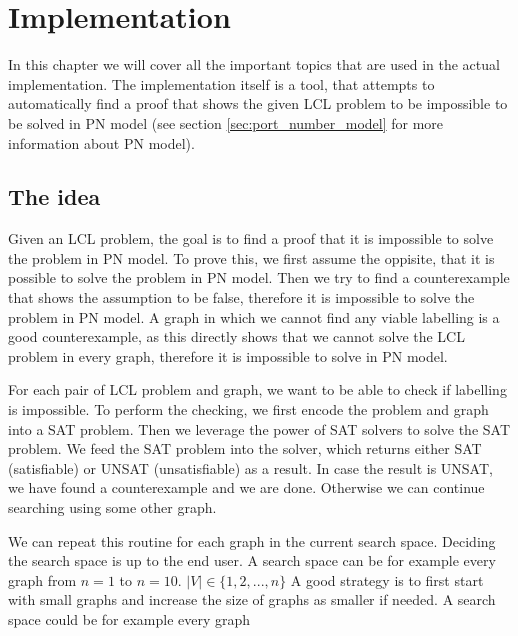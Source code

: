 

\section{Implementation} \label{sec:implementation}
In this chapter we will cover all the important topics that are used in the actual implementation.
The implementation itself is a tool, that attempts to automatically find a proof that shows the given LCL problem to be impossible to be solved in PN model (see section \ref{sec:port_number_model} for more information about PN model).

\subsection{The idea}
Given an LCL problem, the goal is to find a proof that it is impossible to solve the problem in PN model.
To prove this, we first assume the oppisite, that it is possible to solve the problem in PN model.
Then we try to find a counterexample that shows the assumption to be false, therefore it is impossible to solve the problem in PN model.
A graph in which we cannot find any viable labelling is a good counterexample, as this directly shows that we cannot solve the LCL problem in every graph, therefore it is impossible to solve in PN model.

For each pair of LCL problem and graph, we want to be able to check if labelling is impossible.
To perform the checking, we first encode the problem and graph into a SAT problem.
Then we leverage the power of SAT solvers to solve the SAT problem.
We feed the SAT problem into the solver, which returns either SAT (satisfiable) or UNSAT (unsatisfiable) as a result.
In case the result is UNSAT, we have found a counterexample and we are done.
Otherwise we can continue searching using some other graph.

We can repeat this routine for each graph in the current search space.
Deciding the search space is up to the end user.
A search space can be for example every graph from $n=1$ to $n=10$.
$|V| \in \{1, 2, ..., n\}$
A good strategy is to first start with small graphs and increase the size of graphs as smaller if needed.
A search space could be for example every graph 


